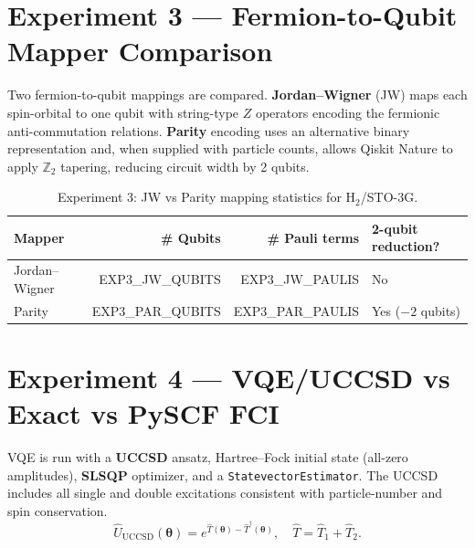 \documentclass[11pt,a4paper]{article}
\begin{document}
\section{Experiment 3 --- Fermion-to-Qubit Mapper Comparison}

Two fermion-to-qubit mappings are compared.
\textbf{Jordan--Wigner} (JW) maps each spin-orbital to one qubit with
string-type $Z$ operators encoding the fermionic anti-commutation relations.
\textbf{Parity} encoding uses an alternative binary representation and,
when supplied with particle counts, allows Qiskit Nature to apply
$\mathbb{Z}_2$ tapering, reducing circuit width by 2 qubits.

\begin{table}[H]
\centering\small
\begin{tabular}{lrrl}
\toprule
Mapper & \# Qubits & \# Pauli terms & 2-qubit reduction? \\
\midrule
Jordan--Wigner & EXP3\_JW\_QUBITS  & EXP3\_JW\_PAULIS  & No \\
Parity         & EXP3\_PAR\_QUBITS & EXP3\_PAR\_PAULIS & Yes ($-2$ qubits) \\
\bottomrule
\end{tabular}
\caption{Experiment 3: JW vs Parity mapping statistics for H$_2$/STO-3G.}
\end{table}

\section{Experiment 4 --- VQE/UCCSD vs Exact vs PySCF FCI}

VQE is run with a \textbf{UCCSD} ansatz, Hartree--Fock initial state
(all-zero amplitudes), \textbf{SLSQP} optimizer, and a
\texttt{StatevectorEstimator}. The UCCSD includes all single and double
excitations consistent with particle-number and spin conservation.
\begin{equation}
  \hat{U}_\text{UCCSD}(\boldsymbol\theta)
  = e^{\hat{T}(\boldsymbol\theta)-\hat{T}^\dagger(\boldsymbol\theta)},
  \quad
  \hat{T} = \hat{T}_1 + \hat{T}_2.
\end{equation}
\end{document}
